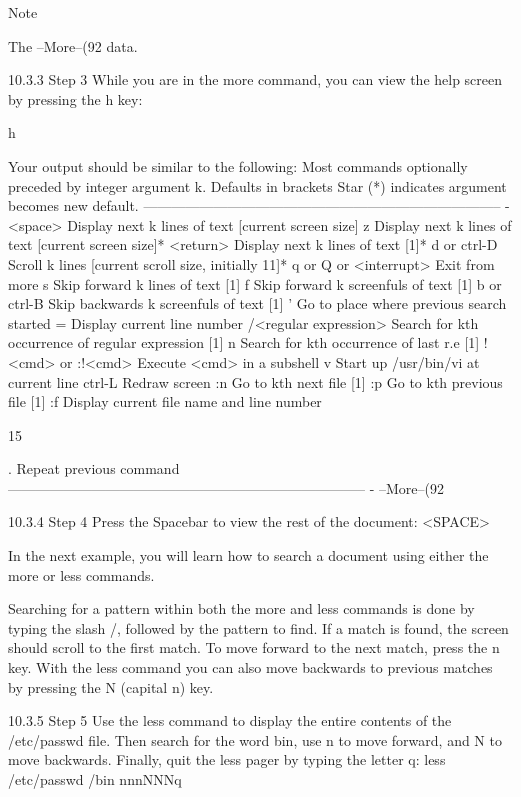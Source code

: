 Note

The --More--(92%
data.

10.3.3 Step 3
While you are in the more command, you can view the help screen by pressing the h key:

h

Your output should be similar to the following:
Most commands optionally preceded by integer argument k. Defaults in
brackets
Star (*) indicates argument becomes new default.
-----------------------------------------------------------------------------
-
<space> Display next k lines of text [current screen size]
z Display next k lines of text [current screen size]*
<return> Display next k lines of text [1]*
d or ctrl-D Scroll k lines [current scroll size, initially 11]*
q or Q or <interrupt> Exit from more
s Skip forward k lines of text [1]
f Skip forward k screenfuls of text [1]
b or ctrl-B Skip backwards k screenfuls of text [1]
' Go to place where previous search started
= Display current line number
/<regular expression> Search for kth occurrence of regular expression [1]
n Search for kth occurrence of last r.e [1]
!<cmd> or :!<cmd> Execute <cmd> in a subshell
v Start up /usr/bin/vi at current line
ctrl-L Redraw screen
:n Go to kth next file [1]
:p Go to kth previous file [1]
:f Display current file name and line number

15



. Repeat previous command
-----------------------------------------------------------------------------
-
--More--(92%

10.3.4 Step 4
Press the Spacebar to view the rest of the document:
<SPACE>

In the next example, you will learn how to search a document using either the more or less
commands.

Searching for a pattern within both the more and less commands is done by typing the slash /,
followed by the pattern to find. If a match is found, the screen should scroll to the first match. To
move forward to the next match, press the n key. With the less command you can also move
backwards to previous matches by pressing the N (capital n) key.

10.3.5 Step 5
Use the less command to display the entire contents of the /etc/passwd file. Then search for
the word bin, use n to move forward, and N to move backwards. Finally, quit the less pager by
typing the letter q:
less /etc/passwd
/bin
nnnNNNq

